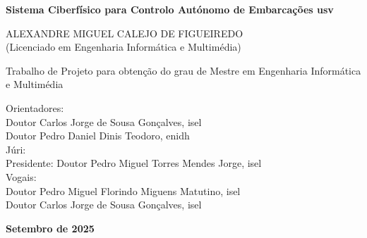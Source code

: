 \thispagestyle{empty} %

\begin{titlepage}
	\vspace*{1cm}	
	\begin{center}
		\LARGE
		\textbf{Sistema Ciberfísico para Controlo Autónomo de Embarcações \acrlong{usv}}\\\vspace{36pt}
	\end{center}\vfill

	\begin{center}
		\Large
		ALEXANDRE MIGUEL CALEJO DE FIGUEIREDO\\
		\large
		(Licenciado em Engenharia Informática e Multimédia)
	\end{center}\vfill

	\begin{center}
		\normalsize
        Trabalho de Projeto para obtenção do grau de Mestre em Engenharia Informática e Multimédia
	\end{center}\vfill
	
	\normalsize
	\noindent\hspace*{3.5cm}
	Orientadores:\\
	\noindent\hspace*{5.5cm}
	Doutor Carlos Jorge de Sousa Gonçalves, \gls{isel}\\
	\noindent\hspace*{5.5cm}
	Doutor Pedro Daniel Dinis Teodoro, \gls{enidh}\\
	
	\noindent\hspace*{3.5cm}
	Júri:\\
	\noindent\hspace*{4.2cm}
	Presidente: Doutor Pedro Miguel Torres Mendes Jorge, \gls{isel}\\
	\noindent\hspace*{4.2cm}
	Vogais:\\
	\noindent\hspace*{5.5cm}
	Doutor Pedro Miguel Florindo Miguens Matutino, \gls{isel}\\
	\noindent\hspace*{5.5cm}
	Doutor Carlos Jorge de Sousa Gonçalves, \gls{isel}\\

	\vfill
	\begin{center}
		\textbf{Setembro de 2025}
	\end{center}
\end{titlepage}

\thispagestyle{empty} %

\thispagestyle{empty} %

\linespread{1.3}







